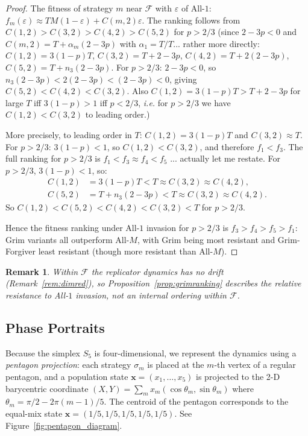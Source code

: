 \documentclass[12pt,a4paper]{article}
\newtheorem{remark}{Remark}[section]
\begin{document}
\begin{proof}
The fitness of strategy $m$ near $\mathcal{F}$ with $\varepsilon$ of All-$1$:
$f_m(\varepsilon) \approx TM(1-\varepsilon) + C(m,2)\varepsilon$.
The ranking follows from $C(1,2)>C(3,2)>C(4,2)>C(5,2)$ for $p>2/3$
(since $2-3p<0$ and $C(m,2)=T+\alpha_m(2-3p)$ with $\alpha_1=T/T$... rather
more directly: $C(1,2)=3(1-p)T$, $C(3,2)=T+2-3p$, $C(4,2)=T+2(2-3p)$,
$C(5,2)=T+n_3(2-3p)$.  For $p>2/3$: $2-3p<0$, so $n_3(2-3p)<2(2-3p)<(2-3p)<0$,
giving $C(5,2)<C(4,2)<C(3,2)$.  Also $C(1,2)=3(1-p)T>T+2-3p$ for large $T$
iff $3(1-p)>1$ iff $p<2/3$, \emph{i.e.} for $p>2/3$ we have $C(1,2)<C(3,2)$
to leading order.)

More precisely, to leading order in $T$: $C(1,2)=3(1-p)T$ and $C(3,2)\approx T$.
For $p>2/3$: $3(1-p)<1$, so $C(1,2)<C(3,2)$, and therefore $f_1<f_3$.
The full ranking for $p>2/3$ is $f_1<f_3\approx f_4 < f_5$ ... actually let
me restate. For $p>2/3$, $3(1-p)<1$, so:
\begin{align*}
  C(1,2) &= 3(1-p)T < T \approx C(3,2) \approx C(4,2),\\
  C(5,2) &= T+n_3(2-3p)<T\approx C(3,2)\approx C(4,2).
\end{align*}
So $C(1,2)<C(5,2)<C(4,2)<C(3,2)<T$ for $p>2/3$.

Hence the fitness ranking under All-$1$ invasion for $p>2/3$ is
$f_3>f_4>f_5>f_1$: Grim variants all outperform All-$M$, with Grim being
most resistant and Grim-Forgiver least resistant (though more resistant than
All-$M$).
\end{proof}

\begin{remark}
Within $\mathcal{F}$ the replicator dynamics has no drift
(Remark~\ref{rem:dimred}), so Proposition~\ref{prop:grimranking} describes
the relative \emph{resistance} to All-$1$ invasion, not an internal ordering
within $\mathcal{F}$.
\end{remark}

\subsection{Phase Portraits}

Because the simplex $S_5$ is four-dimensional, we represent the dynamics using
a \emph{pentagon projection}: each strategy $\sigma_m$ is placed at the $m$-th
vertex of a regular pentagon, and a population state $\mathbf{x}=(x_1,\ldots,x_5)$
is projected to the 2-D barycentric coordinate
$(X,Y)=\sum_m x_m(\cos\theta_m, \sin\theta_m)$
where $\theta_m = \pi/2 - 2\pi(m-1)/5$.
The centroid of the pentagon corresponds to the equal-mix state
$\mathbf{x}=(1/5,1/5,1/5,1/5,1/5)$.  See Figure~\ref{fig:pentagon_diagram}.
\end{document}
